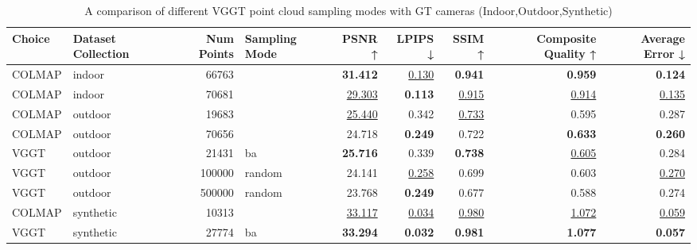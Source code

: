 \begin{table}[H]
\caption{\ifdefined\customcaption \customcaption \else A comparison of different VGGT point cloud sampling modes with GT cameras (Indoor,Outdoor,Synthetic) \fi}
\label{tab:03_sampling_mode_gt_cams_indoor,outdoor,synthetic}
\centering
\scriptsize
\begin{tabular}{llrlrrrrr}
\toprule
Choice & Dataset Collection & Num Points & Sampling Mode & PSNR ↑ & LPIPS ↓ & SSIM ↑ & Composite Quality ↑ & Average Error ↓ \\
\midrule
COLMAP & indoor & 66763 &  & \textbf{31.412} & \underline{0.130} & \textbf{0.941} & \textbf{0.959} & \textbf{0.124} \\
COLMAP & indoor & 70681 &  & \underline{29.303} & \textbf{0.113} & \underline{0.915} & \underline{0.914} & \underline{0.135} \\
\midrule
COLMAP & outdoor & 19683 &  & \underline{25.440} & 0.342 & \underline{0.733} & 0.595 & 0.287 \\
COLMAP & outdoor & 70656 &  & 24.718 & \textbf{0.249} & 0.722 & \textbf{0.633} & \textbf{0.260} \\
VGGT & outdoor & 21431 & ba & \textbf{25.716} & 0.339 & \textbf{0.738} & \underline{0.605} & 0.284 \\
VGGT & outdoor & 100000 & random & 24.141 & \underline{0.258} & 0.699 & 0.603 & \underline{0.270} \\
VGGT & outdoor & 500000 & random & 23.768 & \textbf{0.249} & 0.677 & 0.588 & 0.274 \\
\midrule
COLMAP & synthetic & 10313 &  & \underline{33.117} & \underline{0.034} & \underline{0.980} & \underline{1.072} & \underline{0.059} \\
VGGT & synthetic & 27774 & ba & \textbf{33.294} & \textbf{0.032} & \textbf{0.981} & \textbf{1.077} & \textbf{0.057} \\
\bottomrule
\end{tabular}
\end{table}